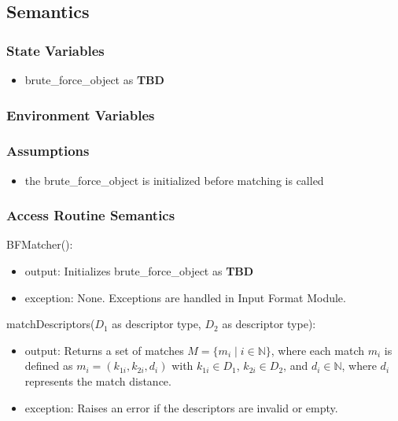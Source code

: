 \documentclass[12pt, titlepage]{article}
\begin{document}
\subsection{Semantics}

\subsubsection{State Variables}
\begin{itemize} 
  \item brute\_force\_object as \textbf{TBD}
\end{itemize}

\subsubsection{Environment Variables}

\subsubsection{Assumptions}
\begin{itemize}
  \item the brute\_force\_object is initialized before matching is called 
\end{itemize}

\subsubsection{Access Routine Semantics}

\noindent BFMatcher():
\begin{itemize}
\item output: Initializes brute\_force\_object  as \textbf{TBD}
\item exception: None. Exceptions are handled in Input Format Module.
\end{itemize}

\noindent matchDescriptors($D_1$ as descriptor type, $D_2$ as descriptor type):
\begin{itemize}
\item output: Returns a set of matches \( M = \{ m_i \mid i \in \mathbb{N} \} \), where each match \( m_i \) is defined as 
$m_i = (k_{1i}, k_{2i}, d_i)$
with \( k_{1i} \in D_1 \), \( k_{2i} \in D_2 \), and \( d_i \in \mathbb{N} \), where \( d_i \) represents the match distance.

\item exception: Raises an error if the descriptors are invalid or empty.
\end{itemize}
\end{document}
